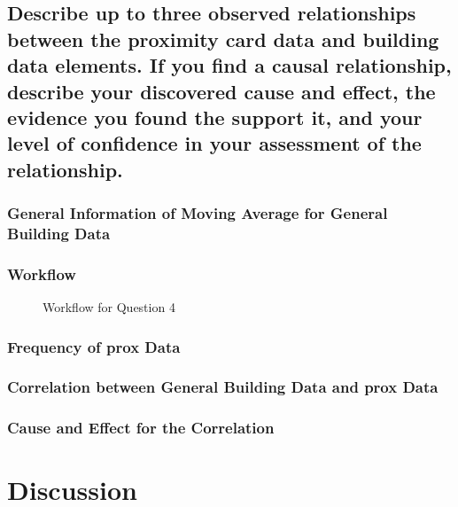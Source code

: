 \documentclass[aps, 10pt, a4paper]{article}
\begin{document}
        \subsection[Question 4]{Describe up to three observed relationships between the proximity card data and building data elements. If you find a causal relationship, describe your discovered cause and effect, the evidence you found the support it, and your level of confidence in your assessment of the relationship.}
            \label{sec:question4}
            \subsubsection{General Information of Moving Average for General Building Data}
            
            \subsubsection{Workflow}
                \begin{figure}[htbp]
                    \centering
                    \begin{tikzpicture}[node distance = 2cm, auto]
                    \end{tikzpicture}
                    \caption{Workflow for Question 4}
                    \label{fig:workflow4}
                \end{figure}
            
            \subsubsection{Frequency of prox Data}
            
            \subsubsection{Correlation between General Building Data and prox Data}
            
            \subsubsection{Cause and Effect for the Correlation}
    
    \section{Discussion}
    
    
    
\end{document}
